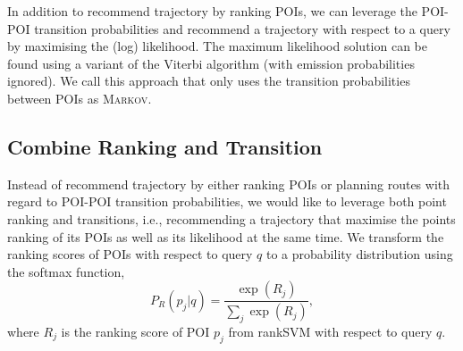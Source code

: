 In addition to recommend trajectory by ranking POIs, we can leverage the POI-POI transition probabilities and 
recommend a trajectory with respect to a query by maximising the (log) likelihood. 
The maximum likelihood solution can be found using a variant of the Viterbi algorithm (with emission probabilities ignored).
We call this approach that only uses the transition probabilities between POIs as \textsc{Markov}.




\subsection{Combine Ranking and Transition}
\label{sec:rank+markov}





Instead of recommend trajectory by either ranking POIs or planning routes with regard to POI-POI transition probabilities, 
we would like to leverage both point ranking and transitions,
i.e., recommending a trajectory that maximise the points ranking of its POIs as well as its likelihood at the same time.
We transform the ranking scores of POIs with respect to query $q$
to a probability distribution using the softmax function,
\begin{equation}
\label{eq:rankprob}
P_R(p_j | q) = \frac{\exp(R_j)}{\sum_j \exp(R_j)},
\end{equation}
where $R_j$ is the ranking score of POI $p_j$ from rankSVM with respect to query $q$.

